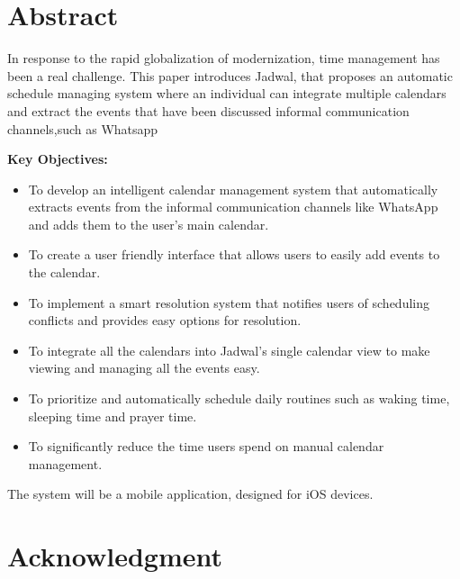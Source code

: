 \documentclass[12pt,a4paper]{report}
\begin{document}
\begin{singlespace}

\chapter*{Abstract}
    
\begin{justify}
In response to the rapid globalization of modernization, time management has been a real challenge. This paper introduces Jadwal, that proposes an automatic schedule managing system where an individual can integrate multiple calendars and extract the events that have been discussed informal communication channels,such as Whatsapp
  
\textbf{Key Objectives:}
\begin{itemize}
    \item To develop an intelligent calendar management system that automatically extracts events from the informal communication channels like WhatsApp and adds them to the user's main calendar.
    \item To create a user friendly interface that allows users to easily add events to the calendar.
    \item To implement a smart resolution system that notifies users of scheduling conflicts and provides easy options for resolution.
    \item To integrate all the calendars into Jadwal's single calendar view to make viewing and managing all the events easy.
    \item To prioritize and automatically schedule daily routines such as waking time, sleeping time and prayer time.
    \item To significantly reduce the time users spend on manual calendar management.
    
\end{itemize}


\begin{center}
    The system will be a mobile application, designed for iOS devices.
    \end{center}




\end{justify}

    
\chapter*{Acknowledgment}
    

\end{singlespace}
\end{document}
